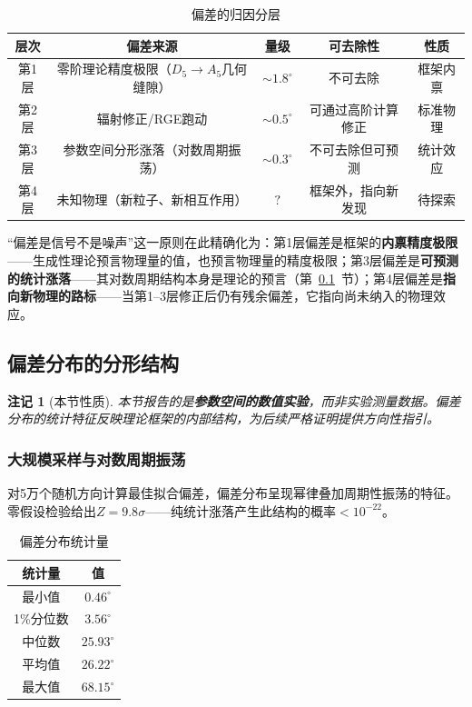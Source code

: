 \documentclass[12pt,a4paper,twocolumn]{article}
\newtheorem{remark}[theorem]{注记}
\begin{document}
\begin{table}[htbp]
\centering
\caption{偏差的归因分层}
\label{tab:deviation_layers}
\begin{tabular}{ccccc}
\hline
层次 & 偏差来源 & 量级 & 可去除性 & 性质 \\
\hline
第1层 & 零阶理论精度极限（$D_5 \to A_5$几何缝隙） & $\sim 1.8^\circ$ & 不可去除 & 框架内禀 \\
第2层 & 辐射修正/RGE跑动 & $\sim 0.5^\circ$ & 可通过高阶计算修正 & 标准物理 \\
第3层 & 参数空间分形涨落（对数周期振荡） & $\sim 0.3^\circ$ & 不可去除但可预测 & 统计效应 \\
第4层 & 未知物理（新粒子、新相互作用） & $?$ & 框架外，指向新发现 & 待探索 \\
\hline
\end{tabular}
\end{table}

``偏差是信号不是噪声''这一原则在此精确化为：第1层偏差是框架的\textbf{内禀精度极限}——生成性理论预言物理量的值，也预言物理量的精度极限；第3层偏差是\textbf{可预测的统计涨落}——其对数周期结构本身是理论的预言（第~\ref{subsec:deviation_fractal}~节）；第4层偏差是\textbf{指向新物理的路标}——当第1--3层修正后仍有残余偏差，它指向尚未纳入的物理效应。

\subsection{偏差分布的分形结构}
\label{subsec:deviation_fractal}

\begin{remark}[本节性质]
本节报告的是\textbf{参数空间的数值实验}，而非实验测量数据。偏差分布的统计特征反映理论框架的内部结构，为后续严格证明提供方向性指引。
\end{remark}

\subsubsection{大规模采样与对数周期振荡}

对5万个随机方向计算最佳拟合偏差，偏差分布呈现幂律叠加周期性振荡的特征。零假设检验给出$Z = 9.8\sigma$——纯统计涨落产生此结构的概率$< 10^{-22}$。

\begin{table}[htbp]
\centering
\caption{偏差分布统计量}
\label{tab:deviation_stats}
\begin{tabular}{cc}
\hline
统计量 & 值 \\
\hline
最小值 & $0.46^\circ$ \\
1\%分位数 & $3.56^\circ$ \\
中位数 & $25.93^\circ$ \\
平均值 & $26.22^\circ$ \\
最大值 & $68.15^\circ$ \\
\hline
\end{tabular}
\end{table}
\end{document}
